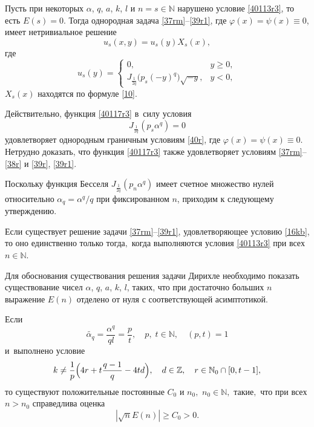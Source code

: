 Пусть при некоторых $\alpha$, $q$, $a$, $k$,  $l$ и $n=s\in \mathbb{N}$ %
нарушено условие \eqref{40113r3}, то есть $E(s)=0$. 
Тогда однородная задача \eqref{37rm}--\eqref{39r1}, где $\varphi(x)=\psi(x)\equiv
0$, имеет нетривиальное решение
\begin{equation}
\label{40117r3} u_{s}(x,y)=u_{s}(y)X_{s}(x),
\end{equation}
где
\begin{equation}
\label{40118r3}
 u_{s}(y)= \left\{
\begin{array}{cl}
0, & y\geq 0,\\
J_{\frac{1}{2q}}{\bigl(p_{s}(-y)^{q}\bigr)}\sqrt{-y}, &  y<0,
\end{array}
\right.
\end{equation}
$X_{s}(x)$ находятся по формуле \eqref{10}.

Действительно, функция \eqref{40117r3} в~силу условия 
$$J_{\frac{1}{2q}}(p_{s}\alpha^{q})=0$$ 
удовлетворяет однородным граничным условиям \eqref{40r}, где $\varphi(x)=\psi(x)\equiv 0$.
Нетрудно доказать, что функция \eqref{40117r3} также удовлетворяет условиям \eqref{37rm}--\eqref{38r} и \eqref{39r}, \eqref{39r1}.

Поскольку функция Бесселя $J_{\frac{1}{2q}}(p_{n}\alpha^{q})$ имеет счетное множество нулей относительно $\alpha_q={\alpha^q}/{q}$ при фиксированном $n$, приходим к следующему утверждению.

\smallskip

\begin{theorem}[1]Если существует решение задачи {\rm \eqref{37rm}--\eqref{39r1},}   удовлетворяющее
 условию {\rm \eqref{16kb},}  то оно единственно только тогда$,$ когда  выполняются условия \eqref{40113r3}
 при всех $n\in \mathbb{N}.$
\end{theorem}

\smallskip


Для обоснования существования решения задачи Дирихле необходимо
показать существование чисел  $\alpha$, $q$, $a$, $k$,  $l$, таких, что при достаточно больших $n$ выражение $E(n)$
отделено от нуля с соответствующей асимптотикой.

\smallskip

\hypertarget{saf:lemma:1}{}

\begin{lemma}[1]Если 
$$
\widetilde{\alpha_{q}}=\frac{\alpha^q}{ql}=\frac p t,\quad  p, \; t\in \mathbb{N},\quad (p,t)=1
$$ 
и~выполнено условие 
$$k\neq
\frac{1}{p}\Bigl(4r+t\frac{q-1}{q}-4td\Bigr),\quad d\in \mathbb{Z},\quad r\in \mathbb{N}_{0}\cap [0, t-1],$$  то существуют положительные
постоянные $C_{0}$ и $n_0,$ $n_0\in \mathbb{N},$ такие$,$ что при всех
$n>n_0$ справедлива оценка
\begin{equation}
\label{ssrm1} |\sqrt{n}E(n)|\geq C_{0}>0.
\end{equation}
\end{lemma}

